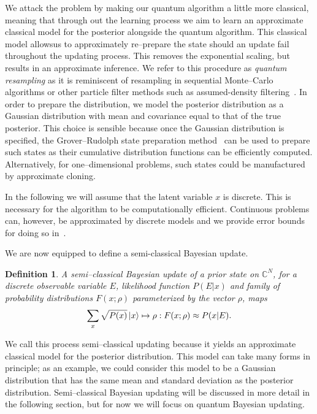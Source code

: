 \documentclass[aps,amsmath,onecolumn,amssymb,notitlepage]{revtex4-1}
\newtheorem{definition}{Definition}
\begin{document}
We attack the problem by making our quantum algorithm a little more classical, meaning that through out the learning process we aim to learn an approximate classical model for the posterior alongside the quantum algorithm.  This classical model allowsus to approximately re--prepare the state should an update fail throughout the updating process.  This removes the exponential scaling, but results in an approximate inference.  We refer to this procedure as \emph{quantum resampling} as it is reminiscent of resampling in sequential Monte--Carlo algorithms or other particle filter methods such as assumed-density filtering~\cite{minka2001expectation}.  In order to prepare the distribution,
we model the posterior distribution as a Gaussian distribution with mean and covariance equal to that of the true posterior.  This choice is sensible because once the Gaussian distribution is specified, the Grover--Rudolph state preparation method~\cite{GR02} can be used to prepare such states as their cumulative distribution functions can be efficiently computed.
Alternatively, for one--dimensional problems, such states could be manufactured by approximate cloning.

In the following we will assume that the latent variable $x$ is discrete.  This is necessary for the algorithm to be computationally efficient.  Continuous problems can, however, be approximated by discrete models and we provide error bounds for doing so in~.

We are now equipped to define a semi-classical Bayesian update.
\begin{definition}
A semi--classical Bayesian update of a prior state on $\mathbb{C}^N$, for a discrete observable variable $E$, likelihood function $P(E|x)$ and family of probability distributions $F(x;\rho)$ parameterized by the vector $\rho$, maps 
$$\sum_x \sqrt{P(x)} \left|x\right\rangle\mapsto \rho: F(x;\rho) \approx P(x|E). $$\label{def:semi}
\end{definition}
We call this process semi--classical updating because it yields an approximate classical model for the posterior distribution.  This model can take many forms in principle; as an example, we could consider this model to be a Gaussian distribution that has the same mean and standard deviation as the posterior distribution.
Semi--classical Bayesian updating will be discussed in more detail in the following section, but for now we will focus on quantum Bayesian updating.

\end{document}
